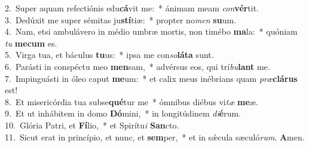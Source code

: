 {2.~}Super aquam refectiónis edu\textbf{cá}vit me:~* ánimam meam \textit{con}\textbf{vér}tit.\\
{3.~}Dedúxit me super sémitas ju\textbf{stí}tiæ:~* propter no\textit{men} \textbf{su}um.\\
{4.~}Nam, etsi ambulávero in médio umbræ mortis, non timébo \textbf{ma}la:~* quóniam \textit{tu} \textbf{me}\textbf{cum} es.\\
{5.~}Virga tua, et báculus \textbf{tu}us:~* ipsa me con\textit{so}\textbf{lá}\textbf{ta} sunt.\\
{6.~}Parásti in conspéctu meo \textbf{men}sam,~* advérsus eos, qui trí\textit{bu}\textbf{lant} me.\\
{7.~}Impinguásti in óleo caput \textbf{me}um:~* et calix meus inébrians quam \textit{præ}\textbf{clá}\textbf{rus} est!\\
{8.~}Et misericórdia tua subse\textbf{qué}tur me~* ómnibus diébus vi\textit{tæ} \textbf{me}æ.\\
{9.~}Et ut inhábitem in domo \textbf{Dó}mini,~* in longitúdinem \textit{di}\textbf{é}rum.\\
{10.~}Glória Patri, et \textbf{Fí}lio,~* et Spirítu\textit{i} \textbf{San}cto.\\
{11.~}Sicut erat in princípio, et nunc, et \textbf{sem}per,~* et in sǽcula sæculó\textit{rum}. \textbf{A}men.\\
